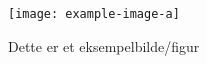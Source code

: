 \begin{figure}
    \centering
    \texttt{[image: example-image-a]}
    \caption{Dette er et eksempelbilde/figur}
    \label{fig:yes}
\end{figure}